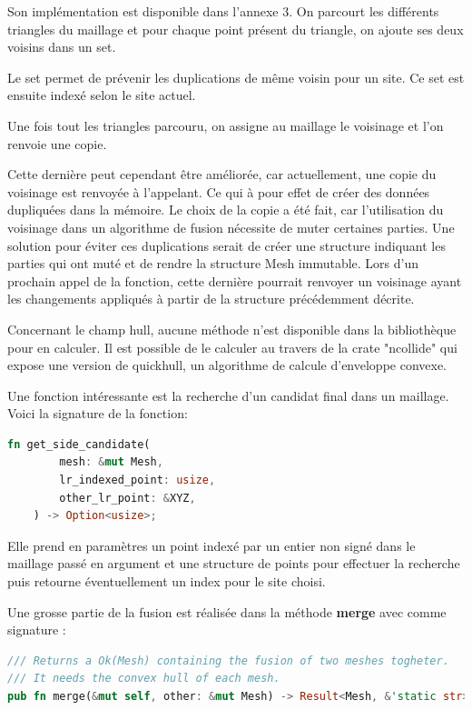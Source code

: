 Son implémentation est disponible dans l'annexe 3. 
On parcourt les différents triangles du maillage et pour chaque point présent du triangle, on ajoute ses deux voisins dans un set.

Le set permet de prévenir les duplications de même voisin pour un site. Ce set est ensuite indexé selon le site actuel.

Une fois tout les triangles parcouru, on assigne au maillage le voisinage et l'on renvoie une copie.

Cette dernière peut cependant
être améliorée, car actuellement, une copie du voisinage est renvoyée à
l'appelant. Ce qui à pour effet de créer des données dupliquées dans la mémoire.
Le choix de la copie a été fait, car l'utilisation du voisinage dans un algorithme de fusion nécessite de
muter certaines parties. Une solution pour éviter ces duplications serait de créer
une structure indiquant les parties qui ont muté et de rendre la structure Mesh
immutable. Lors d'un prochain appel de la fonction, cette dernière pourrait
renvoyer un voisinage ayant les changements appliqués à partir de la structure
précédemment décrite.  

Concernant le champ hull, aucune méthode n'est disponible dans la bibliothèque pour en calculer. Il est possible de le calculer au travers de la crate "ncollide" qui expose une version de quickhull, un algorithme de calcule d'enveloppe convexe.

Une fonction intéressante est la recherche d'un candidat final dans un maillage. Voici la signature de la fonction:
\begin{lstlisting}[language=Rust, style=boxed]
fn get_side_candidate(
        mesh: &mut Mesh,
        lr_indexed_point: usize,
        other_lr_point: &XYZ,
    ) -> Option<usize>;
\end{lstlisting}

Elle prend en paramètres un point indexé par un entier non signé dans le maillage passé en argument et une structure de points pour effectuer la recherche puis retourne éventuellement un index pour le site choisi.

Une grosse partie de la fusion est réalisée dans la méthode \textbf{merge} avec comme signature : 
\begin{lstlisting}[language=Rust, style=boxed]
/// Returns a Ok(Mesh) containing the fusion of two meshes togheter.
/// It needs the convex hull of each mesh.
pub fn merge(&mut self, other: &mut Mesh) -> Result<Mesh, &'static str>;
\end{lstlisting}

